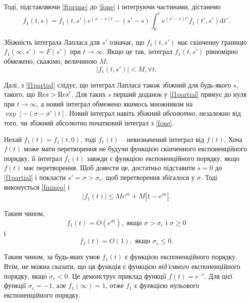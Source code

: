 \documentclass[14pt,twoside]{extreport}
\theoremstyle{mystyle}
\numberwithin{equation}{chapter}
\begin{document}
Тоді, підставляючи \eqref{ftprime} до \eqref{fone} і інтегруючи частинами, дістанемо
\begin{equation}\label{f1partial}
	f_{1}(t,\displaystyle  s)=f_{1}(t, s')e^{(s'-s)t}-(s'-s)\int_{0}^{t}e^{(s'-s)t'}f_{1}(t', s')\mathrm{d}t'.
\end{equation}

Збіжність інтеграла Лапласа для $s'$ означає, що $f_{1}(t, s')$ має скінченну границю $f_{1}(\infty, s')=F(s')$ при $ t\to \infty$. Якщо це так, інтеграл $f_{1}(t, s')$ рівномірно обмежено, скажімо, величиною $M$:
\begin{equation}\label{fmineq}
	|f_{1}(t, s')| <M, \forall t.
\end{equation}

Далі, з \eqref{f1partial} слідує, що інтеграл Лапласа також збіжний для будь-якого $s$, такого, що ${\rm Re} s>{\rm Re} s'$. Для таких $s$ перший доданок у \eqref{f1partial} прямує до нуля при $ t\to \infty$, а новий інтеграл обмежено якимось множником на $\exp[-(\sigma-\sigma')t]$. Новий інтеграл навіть збіжний \emph{абсолютно}, незалежно від того, чи збіжний абсолютно початковий інтеграл з \eqref{fone}.

Нехай $f_{1}(t)=f_{1}(t, 0)$, тоді $f_{1}(t)$ -- невизначений інтеграл від $f(t)$. Хоча $f(t)$ може мати перетворення не будучи функцією скінченного експоненційного порядку, її інтеграл $f_{1}(t)$ завжди є функцією експоненційного порядку, якщо $f(t)$ має перетворення. Щоб довести це, достатньо підставити $s=0$ до \eqref{f1partial} і покласти $s'=\sigma>\sigma_{c}$, щоб перетворення збігалося у $\sigma$. Тоді виконується \eqref{fmineq} і
\begin{equation*}
	|f_{1}(t)|\leqslant Me^{\sigma t}+M|1-e^{\sigma \mathrm{t}}|.
\end{equation*}

Таким чином,
\begin{equation}\label{f1topos}
 f_{1}(t)=O(e^{\sigma t}), \textrm{ якщо }\sigma>\sigma_{c} \textrm{ і }\sigma\geqslant 0
\end{equation}
і
\begin{equation}\label{f1toneg}
f_{1}(t)=O(1), \textrm{ якщо } \sigma_{c}\leqslant 0.
\end{equation}

Таким чином, за будь-яких умов $f_{1}(t)$ є функцією експоненційного порядку. Втім, не можна сказати, що ця функція є функцією \emph{від'ємного} експоненційного порядку, якщо $\sigma_{c}<0$. Це демонструє приклад функції $f(t)=e^{-t}$. Для цієї функції $\sigma_{c}=-1$, але $f_{1}(\infty)=1$, отже $f_{1}$ є функцією нульового експоненційного порядку.
\end{document}
